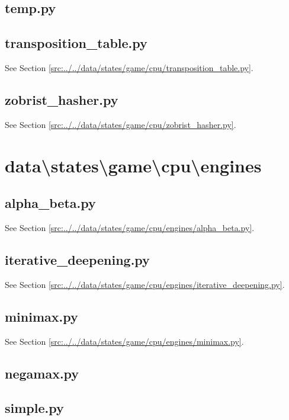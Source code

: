 \documentclass[../main/main.tex]{subfiles}
\begin{document}
\subsection{temp.py}

\label{src:data/states/game/cpu/temp.py}

\subsection{transposition\_table.py}
See Section \ref{src:../../data/states/game/cpu/transposition_table.py}.

\subsection{zobrist\_hasher.py}
See Section \ref{src:../../data/states/game/cpu/zobrist_hasher.py}.

\section{data\textbackslash states\textbackslash game\textbackslash cpu\textbackslash engines}
\subsection{alpha\_beta.py}
See Section \ref{src:../../data/states/game/cpu/engines/alpha_beta.py}.

\subsection{iterative\_deepening.py}
See Section \ref{src:../../data/states/game/cpu/engines/iterative_deepening.py}.

\subsection{minimax.py}
See Section \ref{src:../../data/states/game/cpu/engines/minimax.py}.

\subsection{negamax.py}

\label{src:data/states/game/cpu/engines/negamax.py}

\subsection{simple.py}

\label{src:data/states/game/cpu/engines/simple.py}
\end{document}

